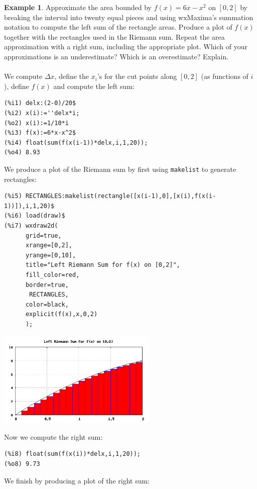 \documentclass[10.5pt,twoside]{report}
\theoremstyle{definition}
\newtheorem{exmp}{Example}[section]
\begin{document}
\begin{exmp}  Approximate the area bounded by $f(x)=6x-x^2$ on $[0,2]$ by breaking the interval into twenty equal pieces and using wxMaxima's summation notation to compute the left sum of the rectangle areas.  Produce a plot of $f(x)$ together with the rectangles used in the Riemann sum.  Repeat the area approximation with a right sum, including the appropriate plot.  Which of your approximations is an underestimate?  Which is an overestimate?  Explain.\\
${}$\\

We compute $\Delta x$, define the $x_i$'s for the cut points along $[0,2]$ (as functions of $i$), define $f(x)$ and compute the left sum:

\begin{verbatim}
(%i1) delx:(2-0)/20$
(%i2) x(i):=''delx*i;
(%o2) x(i):=1/10*i
(%i3) f(x):=6*x-x^2$
(%i4) float(sum(f(x(i-1))*delx,i,1,20));
(%o4) 8.93
\end{verbatim}

We produce a plot of the Riemann sum by first using \verb|makelist| to generate rectangles:

\begin{verbatim}
(%i5) RECTANGLES:makelist(rectangle([x(i-1),0],[x(i),f(x(i-1))]),i,1,20)$
(%i6) load(draw)$
(%i7) wxdraw2d(
      grid=true,
      xrange=[0,2],
      yrange=[0,10],
      title="Left Riemann Sum for f(x) on [0,2]",
      fill_color=red,
      border=true,
       RECTANGLES,
      color=black,
      explicit(f(x),x,0,2)
      );
\end{verbatim}

\includegraphics[width=3in]{example_6_1_1_1}


Now we compute the right sum:

\begin{verbatim}
(%i8) float(sum(f(x(i))*delx,i,1,20));
(%o8) 9.73
\end{verbatim}

We finish by producing a plot of the right sum:


\end{exmp}
\end{document}
